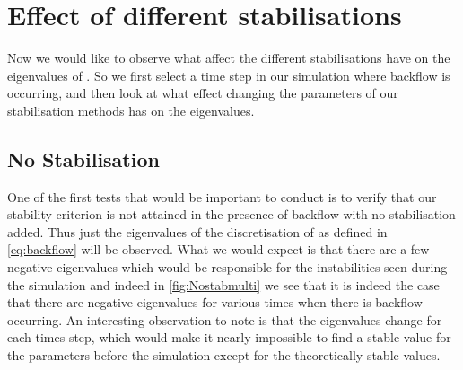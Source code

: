 


\section{Effect of different stabilisations}
Now we would like to observe what affect the different stabilisations have on the eigenvalues of . So we first select a time step in our simulation where backflow is occurring, and then look at what effect changing the parameters of our stabilisation methods has on the eigenvalues.

\subsection{No Stabilisation}
One of the first tests that would be important to conduct is to verify that our stability criterion is not attained in the presence of backflow with no stabilisation added. Thus just the eigenvalues of the discretisation of  as defined in \autoref{eq:backflow} will be observed. What we would expect is that there are a few negative eigenvalues which would be responsible for the instabilities seen during the simulation and indeed in \autoref{fig:Nostabmulti} we see that it is indeed the case that there are negative eigenvalues for various times when there is backflow occurring. An interesting observation to note is that the eigenvalues change for each times step, which would make it nearly impossible to find a stable value for the parameters before the simulation except for the theoretically stable values.

